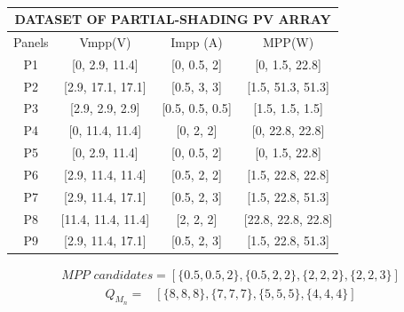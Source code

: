 \documentclass[conference]{IEEEtran}
\begin{document}
\begin{table}[htbp]
\caption{}
\begin{center}
\begin{tabular}{cccc}
\multicolumn{4}{c}{DATASET OF PARTIAL-SHADING PV ARRAY} \\ \hline \hline
Panels & Vmpp(V)                & Impp (A)            & MPP(W)                 \\ \hline
P1     & {[}0, 2.9, 11.4{]}     & {[}0, 0.5, 2{]}     & {[}0, 1.5, 22.8{]}     \\
P2     & {[}2.9, 17.1, 17.1{]}  & {[}0.5, 3, 3{]}     & {[}1.5, 51.3, 51.3{]}  \\
P3     & {[}2.9, 2.9, 2.9{]}    & {[}0.5, 0.5, 0.5{]} & {[}1.5, 1.5, 1.5{]}    \\
P4     & {[}0, 11.4, 11.4{]}    & {[}0, 2, 2{]}       & {[}0, 22.8, 22.8{]}    \\
P5     & {[}0, 2.9, 11.4{]}     & {[}0, 0.5, 2{]}     & {[}0, 1.5, 22.8{]}     \\
P6     & {[}2.9, 11.4, 11.4{]}  & {[}0.5, 2, 2{]}     & {[}1.5, 22.8, 22.8{]}  \\
P7     & {[}2.9, 11.4, 17.1{]}  & {[}0.5, 2, 3{]}     & {[}1.5, 22.8, 51.3{]}  \\
P8     & {[}11.4, 11.4, 11.4{]} & {[}2, 2, 2{]}       & {[}22.8, 22.8, 22.8{]} \\
P9     & {[}2.9, 11.4, 17.1{]}  & {[}0.5, 2, 3{]}     & {[}1.5, 22.8, 51.3{]} 
\end{tabular}
\label{tab1}
\end{center}
\end{table}

\begin{equation}
\begin{aligned}
\textit{MPP candidates} = [\{ 0.5, 0.5, 2\}, \{0.5, 2, 2\}, \{2, 2, 2\}, \{2, 2, 3\}]
\end{aligned}\label{mpp}
\end{equation}
\begin{equation}
\begin{aligned}
\textit{$Q_{M_n}$} = &  [\{8, 8, 8\}, \{7, 7, 7\}, \{5, 5, 5\}, \{4, 4, 4\}]
\end{aligned}
\label{qmn}
\end{equation}
\end{document}
